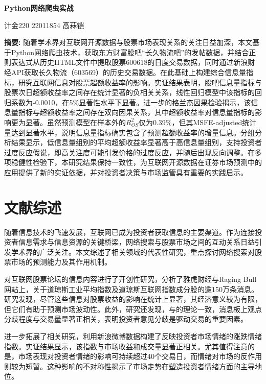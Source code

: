 \documentclass[12pt, a4paper]{article}
\begin{document}
\begin{center}
\LARGE\textbf{Python网络爬虫实战}

\vspace{1cm}
\large 计金220 22011854 高菻铠
\end{center}

\noindent \textbf{摘要:} 随着学术界对互联网开源数据与股票市场表现关系的关注日益加深，本文基于Python网络爬虫技术，获取东方财富股吧“长久物流吧”的发帖数据，并结合正则表达式从历史HTML文件中提取股票600618的日度交易数据，同时通过新浪财经API获取长久物流（603569）的历史交易数据。在此基础上构建综合信息量指标，研究互联网信息对股票超额收益率的影响。实证结果表明，股吧信息量指标与股票次日超额收益率之间存在统计显著的负相关关系，线性回归模型中该指标的回归系数为-0.0010，在5\%显著性水平下显著。进一步的格兰杰因果检验揭示，该信息量指标与超额收益率之间存在双向因果关系，其中超额收益率对信息量指标的影响更为显著。虽然预测模型在样本外的$R^2_{OS}$仅为0.39\%，但其MSFE-adjusted统计量达到显著水平，说明信息量指标确实包含了预测超额收益率的增量信息。分组分析结果显示，低信息量组别的平均超额收益率显著高于高信息量组别，支持投资者过度反应假说，即高关注度可能引发价格的过度反应，并随后出现反向调整。在多项稳健性检验下，本研究结果保持一致性，为互联网开源数据在证券市场预测中的应用提供了新的实证依据，并对投资者决策与市场监管具有重要的实践启示。

\section{文献综述}

随着信息技术的飞速发展，互联网已成为投资者获取信息的主要渠道。作为连接投资者信息需求与信息资源的关键桥梁，网络搜索与股票市场之间的互动关系日益引发学术界的广泛关注。本文综述了相关领域的代表性研究，重点探讨网络搜索对股票市场的预测能力及其作用机制。

\citet{antweiler2004information}对互联网股票论坛的信息内容进行了开创性研究，分析了雅虎财经与Raging Bull网站上，关于道琼斯工业平均指数及道琼斯互联网指数成分股的逾150万条消息。研究发现，尽管这些信息对股票收益的影响在统计上显著，其经济意义较为有限，但它们有助于预测市场波动性。此外，研究还发现，与\citet{harris1993differences}的理论一致，消息板上观点分歧程度与交易量显著正相关，表明投资者意见分歧是驱动交易的重要因素。

\citet{cheng2013investor}进一步拓展了相关研究，利用新浪微博数据构建了反映投资者市场情绪的涨跌情绪指数。实证结果显示，该指数与市场收益和成交量显著正相关。尤其值得注意的是，市场表现对投资者情绪的影响可持续超过40个交易日，而情绪对市场的反作用则较为短暂。这种影响的不对称性揭示了市场走势在塑造投资者情绪方面的主导地位。
\end{document}
